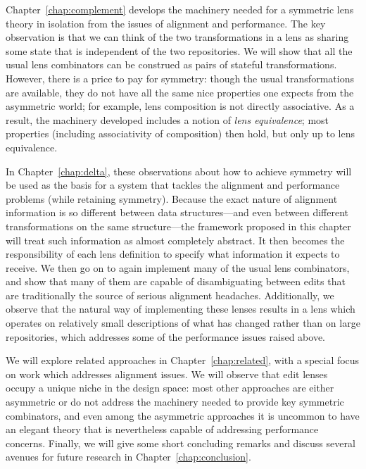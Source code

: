 Chapter~\ref{chap:complement} develops the machinery needed for a symmetric
lens theory in isolation from the issues of alignment and performance. The
key observation is that we can think of the two transformations in a lens as
sharing some state that is independent of the two repositories. We will show
that all the usual lens combinators can be construed as pairs of stateful
transformations. However, there is a price to pay for symmetry: though the
usual transformations are available, they do not have all the same nice
properties one expects from the asymmetric world; for example, lens
composition is not directly associative. As a result, the machinery
developed includes a notion of \emph{lens equivalence}; most properties
(including associativity of composition) then hold, but only up to lens
equivalence.

In Chapter~\ref{chap:delta}, these observations about how to achieve
symmetry will be used as the basis for a system that tackles the alignment
and performance problems (while retaining symmetry). Because the exact
nature of alignment information is so different between data
structures---and even between different transformations on the same
structure---the framework proposed in this chapter will treat such
information as almost completely abstract. It then becomes the
responsibility of each lens definition to specify what information it
expects to receive. We then go on to again implement many of the usual lens
combinators, and show that many of them are capable of disambiguating
between edits that are traditionally the source of serious alignment
headaches. Additionally, we observe that the natural way of implementing
these lenses results in a lens which operates on relatively small
descriptions of what has changed rather than on large repositories, which
addresses some of the performance issues raised above.

We will explore related approaches in Chapter~\ref{chap:related}, with a
special focus on work which addresses alignment issues. We will observe that
edit lenses occupy a unique niche in the design space: most other approaches
are either asymmetric or do not address the machinery needed to provide key
symmetric combinators, and even among the asymmetric approaches it is
uncommon to have an elegant theory that is nevertheless capable of
addressing performance concerns.
Finally, we will give some short concluding remarks and discuss several
avenues for future research in Chapter~\ref{chap:conclusion}.

